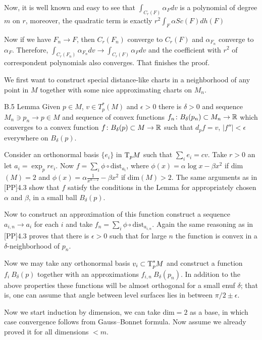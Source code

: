 \documentclass{article}
\begin{document}
Now, it is well known and easy to see that
$\int_{C_r(F)}\alpha_Fdv$ is a polynomial of degree $m$ on $r$,
moreover, the quadratic term is exactly $r^2\int_F\alpha Sc(F)
dh(F)$

Now if we have $F_n\to F$, then $C_r(F_n)$ converge to $C_r(F)$
and $\alpha_{F_n}$ converge to $\alpha_{F}$. Therefore,
$\int_{C_r(F_n)}\alpha_{F_n}dv\to\int_{C_r(F)}\alpha_Fdv$ and the
 coefficient with $r^2$ of correspondent polynomials also converges.
That finishes the proof.\qeds


 We first want to construct special
distance-like charts in a neighborhood of any point in $M$
together with some nice approximating charts on $M_n$.


\begin{thm}{B.5 Lemma} Given $p\in M$, $v\in T_p^*(M)$ and $\epsilon>0$
there is $\delta>0$ and sequence $M_n\ni p_n\to p\in M$ and
sequence of convex functions $f_n\colon B_\delta(p_n)\subset M_n\to \mathbb{R}$
which converges to a convex function $f\colon B_\delta(p)\subset M\to
\mathbb{R}$ such that $d_pf=v$, $|f''|<\epsilon$ everywhere on
$B_\delta(p)$.
\end{thm}


 Consider an orthonormal basis $\{e_i\}$
in $\text{\rm T}_p M$ such that $\sum_i e_i=cv$. Take $r >0$ an let
$a_i=\exp_p r e_i$. Now $f=\sum_i \phi\circ\text{dist}_{a_i}$,
where $\phi(x)=\alpha \log x-\beta x^2$ if dim$(M)=2$ and
$\phi(x)=\alpha \frac{1}{x^{n-2}}-\beta x^2$ if dim$(M)>2$. The
same arguments as in [PP]4.3 show that $f$ satisfy the conditions
in the Lemma for appropriately chosen $\alpha$ and $\beta$, in a
small ball $B_\delta(p)$.

Now to construct an approximation of this function construct a
sequence $a_{i,n}\to a_i$ for each $i$ and take $f_n=\sum_i
\phi\circ\text{dist}_{a_{i,n}}$. Again the same reasoning as in
[PP]4.3 proves that there is $\epsilon>0$ such that for large $n$
the function is convex in a $\delta$-neighborhood of $p_n$.\qeds


Now we may take any orthonormal basis ${v_i}\subset \text{\rm T}^*_p M$ and
construct a function $f_i\:B_\delta(p)$ together with an approximations
$f_{i,n}\:B_\delta(p_n)$. In addition to the above properties these
functions will be almost orthogonal for a small enuf $\delta$;
that is, one can assume
that angle between level surfaces lies in between $\pi/2\pm\epsilon$.


Now we start induction by dimension, we can take dim$=2$ as a base, in which case convergence follows from Gauss--Bonnet formula. Now assume we already proved it for all dimensions $<m$.
\end{document}
